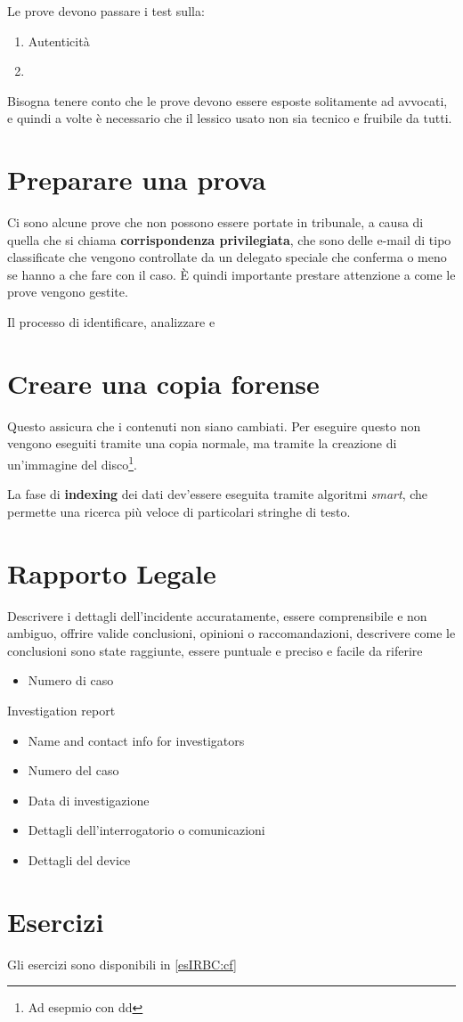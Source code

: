 Le prove devono passare i test sulla:
\begin{enumerate}
\item Autenticità
\item {}
\end{enumerate}

Bisogna tenere conto che le prove devono essere esposte solitamente ad avvocati,
e quindi a volte è necessario che il lessico usato non sia tecnico e fruibile da
tutti.

\section{Preparare una prova}

Ci sono alcune prove che non possono essere portate in tribunale, a causa di
quella che si chiama \textbf{corrispondenza privilegiata}, che sono delle e-mail
di tipo classificate che vengono controllate da un delegato speciale che
conferma o meno se hanno a che fare con il caso. È quindi importante prestare
attenzione a come le prove vengono gestite.


Il processo di identificare, analizzare e 

\section{Creare una copia forense}

Questo assicura che i contenuti non siano cambiati. Per eseguire questo non
vengono eseguiti tramite una copia normale, ma tramite la creazione di
un'immagine del disco\footnote{Ad esepmio con dd}.

La fase di \textbf{indexing} dei dati dev'essere eseguita tramite algoritmi
\textit{smart}, che permette una ricerca più veloce di particolari stringhe di
testo.

\section{Rapporto Legale}

Descrivere i dettagli dell'incidente accuratamente, essere comprensibile e non
ambiguo, offrire valide conclusioni, opinioni o raccomandazioni, descrivere come
le conclusioni sono state raggiunte, essere puntuale e preciso e facile da
riferire



\begin{itemize}
\item Numero di caso

\end{itemize}

Investigation report
\begin{itemize}
\item Name and contact info for investigators
\item Numero del caso
\item Data di investigazione
\item Dettagli dell'interrogatorio o comunicazioni
\item Dettagli del device

\end{itemize}


\section{Esercizi}

Gli esercizi sono disponibili in \ref{esIRBC:cf}
